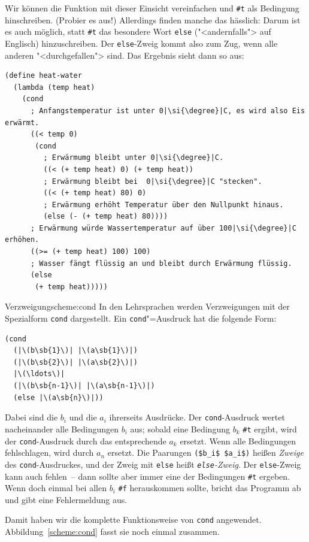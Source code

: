Wir können die Funktion mit dieser Einsicht vereinfachen und \lstinline{#t}
als Bedingung hinschreiben.  (Probier es aus!)  Allerdings finden
manche das hässlich: Darum ist es auch möglich, statt \lstinline{#t} das
besondere Wort \lstinline{else}
("<andernfalls"> auf Englisch) hinzuschreiben.
Der \lstinline{else}-Zweig kommt also zum Zug, wenn alle anderen
"<durchgefallen"> sind.  Das Ergebnis sieht
dann so aus:
%
\begin{lstlisting}
(define heat-water
  (lambda (temp heat)
    (cond
      ; Anfangstemperatur ist unter 0|\si{\degree}|C, es wird also Eis erwärmt.
      ((< temp 0)
       (cond
         ; Erwärmumg bleibt unter 0|\si{\degree}|C.
         ((< (+ temp heat) 0) (+ temp heat))
         ; Erwärmung bleibt bei  0|\si{\degree}|C "stecken".
         ((< (+ temp heat) 80) 0)
         ; Erwärmung erhöht Temperatur über den Nullpunkt hinaus.
         (else (- (+ temp heat) 80))))
      ; Erwärmung würde Wassertemperatur auf über 100|\si{\degree}|C erhöhen.
      ((>= (+ temp heat) 100) 100)
      ; Wasser fängt flüssig an und bleibt durch Erwärmung flüssig.
      (else
       (+ temp heat)))))
\end{lstlisting}
%
\begin{feature}{Verzweigung}{scheme:cond}
In den Lehrsprachen werden Verzweigungen
mit der Spezialform \lstinline{cond} dargestellt.
Ein \lstinline{cond}"=Ausdruck hat die folgende Form:
%
\begin{lstlisting}
(cond
  (|\(b\sb{1}\)| |\(a\sb{1}\)|)
  (|\(b\sb{2}\)| |\(a\sb{2}\)|)
  |\(\ldots\)|
  (|\(b\sb{n-1}\)| |\(a\sb{n-1}\)|)
  (else |\(a\sb{n}\)|))
\end{lstlisting}
%
Dabei sind die $b_i$ und die $a_i$ ihrerseits Ausdrücke.  Der
\lstinline{cond}-Ausdruck wertet nacheinander alle Bedingungen $b_i$ aus;
sobald eine Bedingung $b_k$ \lstinline{#t} ergibt, wird der
\lstinline{cond}-Ausdruck durch das entsprechende $a_k$ ersetzt.  Wenn
alle Bedingungen fehlschlagen, wird durch $a_n$ ersetzt.  Die Paarungen
\lstinline{($b_i$ $a_i$)} heißen \textit{Zweige} des
\lstinline{cond}-Ausdruckes, und der Zweig mit \lstinline{else}  heißt
\textit{\lstinline{else}-Zweig}.
Der \lstinline{else}-Zweig kann auch fehlen~-- dann sollte aber immer
eine der Bedingungen  \lstinline{#t} ergeben.  Wenn doch einmal bei allen
$b_i$ \lstinline{#f} herauskommen sollte, bricht \drscheme{} das Programm ab
und gibt eine Fehlermeldung aus.
\end{feature}
%
Damit haben wir die komplette Funktionsweise von \lstinline{cond}
angewendet. Abbildung~\ref{scheme:cond} fasst sie noch einmal zusammen.

